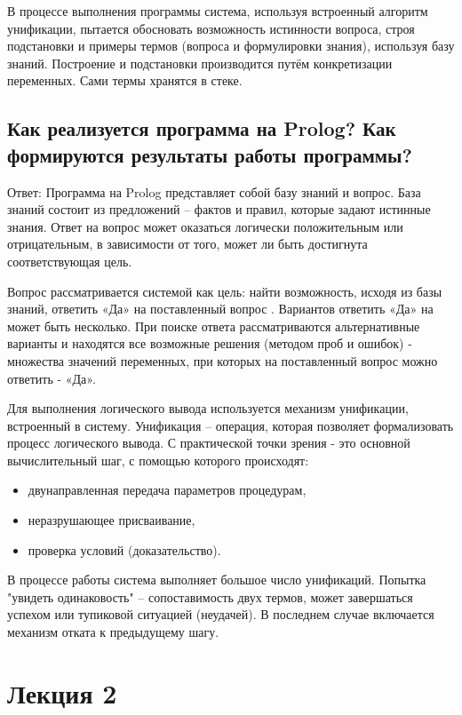 \documentclass[12pt]{report}
\begin{document}
В процессе выполнения программы система, используя встроенный алгоритм унификации, пытается обосновать возможность истинности вопроса, строя подстановки и примеры термов (вопроса и формулировки знания), используя базу знаний. Построение и подстановки производится путём конкретизации переменных. Сами термы хранятся в стеке.



\section{Как реализуется программа на Prolog? Как формируются результаты работы программы?}

Ответ: Программа на Prolog представляет собой базу знаний и вопрос. База знаний состоит из предложений -- фактов и правил, которые задают истинные знания. Ответ на вопрос может оказаться логически положительным или отрицательным, в зависимости от того, может ли быть достигнута соответствующая цель. 

Вопрос рассматривается системой как цель: найти возможность, исходя из базы знаний, ответить «Да» на поставленный вопрос . Вариантов ответить «Да» на может быть несколько. При поиске ответа рассматриваются альтернативные варианты и находятся все возможные решения (методом проб и ошибок) - множества значений переменных, при которых на поставленный вопрос можно ответить - «Да».


Для выполнения логического вывода используется механизм унификации, встроенный в систему.
Унификация – операция, которая позволяет формализовать процесс логического вывода. С практической точки зрения  - это основной вычислительный шаг, с помощью которого происходят:
\begin{itemize}
	\item двунаправленная передача параметров процедурам,
	\item неразрушающее присваивание,
	\item проверка условий (доказательство).
\end{itemize}

В процессе работы система выполняет большое число унификаций.  Попытка "увидеть одинаковость" – сопоставимость двух термов, может завершаться успехом или тупиковой ситуацией (неудачей). В последнем случае включается механизм отката к предыдущему шагу.




\chapter*{Лекция 2}
\end{document}

